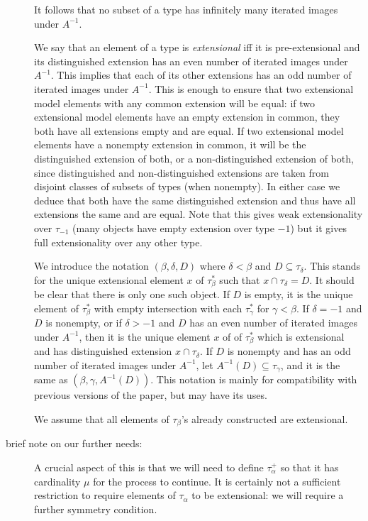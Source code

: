 \documentclass[112pt]{article}
\begin{document}
\begin{description}
  It follows that no subset of a type has
infinitely many iterated images under $A^{-1}$.



We say that an element of a type is {\em extensional\/} iff
it is pre-extensional and its distinguished extension has an even number of iterated images under $A^{-1}$.
This implies that each of its other extensions has an odd number of iterated images under $A^{-1}$.  This is enough to ensure that two extensional model elements with any common extension will be equal:  if two extensional model elements have an empty extension in common, they both have all extensions empty and are equal.  If two extensional model elements have a nonempty extension in common, it will be the distinguished extension of both, or a non-distinguished extension of both, since distinguished and non-distinguished extensions are taken from disjoint classes of subsets of types (when nonempty).
In either case we deduce that both have the same distinguished extension and thus have all extensions the same and are equal.  Note that this gives weak extensionality over $\tau_{-1}$ (many objects have empty extension over type $-1$) but it gives full extensionality over any other type.

We introduce the notation $(\beta,\delta,D)$ where $\delta<\beta$ and  $D \subseteq \tau_\delta$.   This stands for the unique extensional element $x$ of $\tau_\beta^*$ such that $x \cap \tau_\delta = D$.  It should be clear that there is only one such object.  If $D$ is empty, it is the unique
element of $\tau_\beta^*$ with empty intersection with each $\tau_\gamma^*$ for $\gamma<\beta$.  If $\delta=-1$ and $D$ is nonempty, or if $\delta >-1$
and $D$ has an even number of iterated images under $A^{-1}$, then it is the unique element $x$ of of $\tau_\beta^*$ which is extensional and has distinguished extension $x \cap \tau_\delta$.  If $D$ is nonempty and has an odd number of iterated images under $A^{-1}$, let $A^{-1}(D) \subseteq \tau_\gamma$, and it is the same as $(\beta,\gamma,A^{-1}(D))$.  This notation is mainly for compatibility with previous versions of the paper, but may have its uses.

We assume that all elements of $\tau_\beta$'s already constructed are extensional.

\item[brief note on our further needs:]  A crucial aspect of this is that we will need to define $\tau_\alpha^+$ so that it has cardinality $\mu$ for the process to continue.  It is certainly not a sufficient restriction to require elements of $\tau_\alpha$ to be extensional:  we will require a further symmetry condition.


\end{description}
\end{document}
